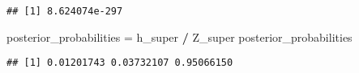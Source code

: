 \documentclass[
]{article}
\newenvironment{Shaded}{\begin{snugshade}}{\end{snugshade}}
\newcommand{\NormalTok}[1]{#1}
\newcommand{\OtherTok}[1]{\textcolor[rgb]{0.56,0.35,0.01}{#1}}
\newcommand{\SpecialCharTok}[1]{\textcolor[rgb]{0.81,0.36,0.00}{\textbf{#1}}}
\begin{document}
\begin{verbatim}
## [1] 8.624074e-297
\end{verbatim}

\begin{Shaded}
\begin{Highlighting}[]
\NormalTok{posterior\_probabilities }\OtherTok{=}\NormalTok{ h\_super }\SpecialCharTok{/}\NormalTok{ Z\_super}
\NormalTok{posterior\_probabilities}
\end{Highlighting}
\end{Shaded}

\begin{verbatim}
## [1] 0.01201743 0.03732107 0.95066150
\end{verbatim}
\end{document}
